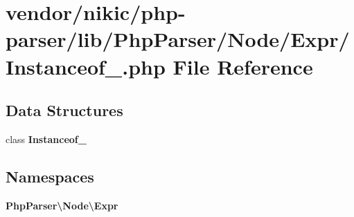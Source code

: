 \section{vendor/nikic/php-\/parser/lib/\+Php\+Parser/\+Node/\+Expr/\+Instanceof\+\_\+.php File Reference}
\label{_instanceof___8php}
\subsection*{Data Structures}
\begin{DoxyCompactItemize}
\item 
class {\bf Instanceof\+\_\+}
\end{DoxyCompactItemize}
\subsection*{Namespaces}
\begin{DoxyCompactItemize}
\item 
 {\bf Php\+Parser\textbackslash{}\+Node\textbackslash{}\+Expr}
\end{DoxyCompactItemize}
